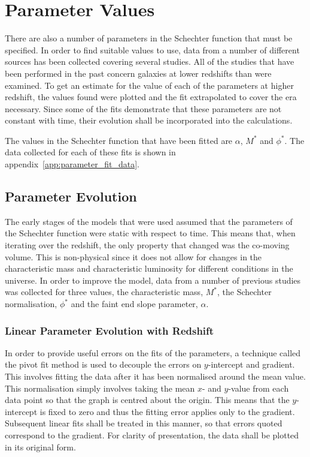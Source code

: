 \section{Parameter Values} %
\label{sec:parameter_values}
	There are also a number of parameters in the Schechter function that must be specified. In order to find suitable values to use, data from a number of different sources has been collected covering several studies. All of the studies that have been performed in the past concern galaxies at lower redshifts than were examined. To get an estimate for the value of each of the parameters at higher redshift, the values found were plotted and the fit extrapolated to cover the era necessary. Since some of the fits demonstrate that these parameters are not constant with time, their evolution shall be incorporated into the calculations.

	The values in the Schechter function that have been fitted are $\alpha$, $M^{*}$ and $\phi^{*}$. The data collected for each of these fits is shown in appendix~\ref{app:parameter_fit_data}.

	\subsection{Parameter Evolution} %
	\label{sub:parameter_evolution}
		The early stages of the models that were used assumed that the parameters of the Schechter function were static with respect to time. This means that, when iterating over the redshift, the only property that changed was the co-moving volume. This is non-physical since it does not allow for changes in the characteristic mass and characteristic luminosity for different conditions in the universe. In order to improve the model, data from a number of previous studies was collected for three values, the characteristic mass, $M^*$, the Schechter normalisation, $\phi^*$ and the faint end slope parameter, $\alpha$.

		\subsubsection{Linear Parameter Evolution with Redshift} %
		\label{ssub:linear_parameter_evolution_with_redshift}
			In order to provide useful errors on the fits of the parameters, a technique called the pivot fit method is used to decouple the errors on $y$-intercept and gradient. This involves fitting the data after it has been normalised around the mean value. This normalisation simply involves taking the mean $x$- and $y$-value from each data point so that the graph is centred about the origin. This means that the $y$-intercept is fixed to zero and thus the fitting error applies only to the gradient. Subsequent linear fits shall be treated in this manner, so that errors quoted correspond to the gradient. For clarity of presentation, the data shall be plotted in its original form.


